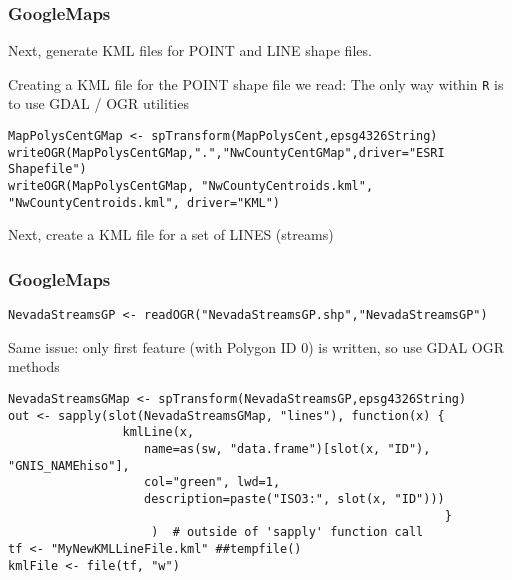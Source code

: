 \documentclass{beamer}
\begin{document}
\begin{frame}[fragile]
\frametitle{GoogleMaps}

Next,  generate KML files for POINT and LINE shape files.

Creating a KML file for the POINT shape file we read: The only way within \texttt{R} is to use GDAL / OGR utilities  

\begin{framed}
\begin{verbatim}
MapPolysCentGMap <- spTransform(MapPolysCent,epsg4326String)
writeOGR(MapPolysCentGMap,".","NwCountyCentGMap",driver="ESRI Shapefile")     
writeOGR(MapPolysCentGMap, "NwCountyCentroids.kml", "NwCountyCentroids.kml", driver="KML")   
\end{verbatim}
\end{framed}
Next, create a KML file for a set of LINES (streams) 
\end{frame}
\begin{frame}[fragile]
\frametitle{GoogleMaps}
\begin{framed}
\begin{verbatim}
NevadaStreamsGP <- readOGR("NevadaStreamsGP.shp","NevadaStreamsGP") 
\end{verbatim}
\end{framed}
Same issue: only first feature (with Polygon ID 0) is written, so use GDAL OGR methods

\begin{framed}
\begin{verbatim}
NevadaStreamsGMap <- spTransform(NevadaStreamsGP,epsg4326String)
out <- sapply(slot(NevadaStreamsGMap, "lines"), function(x) {
                kmlLine(x,
                   name=as(sw, "data.frame")[slot(x, "ID"), "GNIS_NAMEhiso"],     
                   col="green", lwd=1, 
                   description=paste("ISO3:", slot(x, "ID")))
                                                             }
                    )  # outside of 'sapply' function call
tf <- "MyNewKMLLineFile.kml" ##tempfile()
kmlFile <- file(tf, "w")
\end{verbatim}
\end{framed}

\end{frame}
\end{document}
